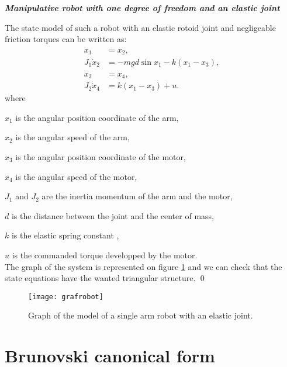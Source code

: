 \begin{exemple}{\bf \em Manipulative robot with one degree of freedom and an elastic joint \label{exrobot}}

The state model of such a robot with an elastic rotoid joint and negligeable friction torques can be written as:
\begin{equation} \begin{split} \label{robotelast}
\dot x_1 &= x_2,  \\
J_1\dot x_2 &= -mgd\sin x_1 - k(x_1 - x_3),  \\
\dot x_3 &= x_4,  \\
J_2\dot x_4 &= k(x_1 - x_3) + u.
\end{split} \end{equation}
where

$x_1$ is the angular position coordinate of the arm,

$x_2$ is the angular speed of the arm,

$x_3$ is the angular position coordinate of the motor,

$x_4$ is the angular speed of the motor,

$J_1$ and $J_2$ are the inertia momentum of the arm and the motor,

$d$ is the distance between the joint and the center of mass,

$k$ is the elastic spring constant ,

$u$ is the commanded torque developped by the motor.\\

\noindent The graph of the system is represented on figure
\ref{Fig:grafrobot} and we can check that the state equations have the wanted triangular structure. \qed
\begin{figure}[htbp]
   \centering
   \texttt{[image: grafrobot]} 
   \caption{Graph of the model of a single arm robot with an elastic joint.}
   \label{Fig:grafrobot}
\end{figure}
\end{exemple}

\section{Brunovski canonical form}\label{sectionbrunovski}

